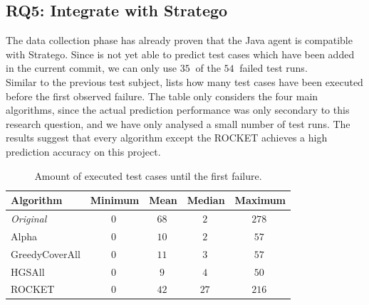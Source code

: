 \clearpage

\subsection{RQ5: Integrate \velocity{} with Stratego}
The data collection phase has already proven that the Java agent is compatible with Stratego. Since \velocity{} is not yet able to predict test cases which have been added in the current commit, we can only use $\SI{35}{}$ of the $\SI{54}{}$ failed test runs.\\

\noindent Similar to the previous test subject,  lists how many test cases have been executed before the first observed failure. The table only considers the four main algorithms, since the actual prediction performance was only secondary to this research question, and we have only analysed a small number of test runs. The results suggest that every algorithm except the ROCKET achieves a high prediction accuracy on this project.\\

\begin{table}[h]
	\centering
	\begin{tabularx}{\textwidth}{|X||c|c|c|c|}
		\hline
		\textbf{Algorithm} & \textbf{Minimum} & \textbf{Mean} & \textbf{Median} & \textbf{Maximum}\\
		
		\hline
		
		\emph{Original} & $\SI{0}{}$ & $\SI{68}{}$ & $\SI{2}{}$ & $\SI{278}{}$\\
		
		\hline
		
		Alpha & $\SI{0}{}$ & $\SI{10}{}$ & $\SI{2}{}$ & $\SI{57}{}$\\
		
		\hline
		
		GreedyCoverAll & $\SI{0}{}$ & $\SI{11}{}$ & $\SI{3}{}$ & $\SI{57}{}$\\
		
		\hline
		
		HGSAll & $\SI{0}{}$ & $\SI{9}{}$ & $\SI{4}{}$ & $\SI{50}{}$\\
		
		\hline
		
		ROCKET & $\SI{0}{}$ & $\SI{42}{}$ & $\SI{27}{}$ & $\SI{216}{}$\\
		
		\hline
	\end{tabularx}
	\caption{Amount of executed test cases until the first failure.}
	\label{tbl:rq5-first-failure}
\end{table}

